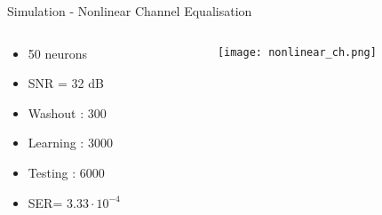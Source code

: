 \begin{frame}{Simulation - Nonlinear Channel Equalisation}

	\begin{columns} %
	\begin{column}{.33\textwidth}
	
		\begin{itemize}
			\item 50 neurons
			\item SNR = 32 dB
			\item Washout : 300
			\item Learning : 3000
			\item Testing : 6000
			\item SER= $3.33 \cdot 10^{-4}$
		\end{itemize}
		
	\end{column}%
	\hfill%
	\begin{column}{.63\textwidth}
	\begin{figure}
		\texttt{[image: nonlinear\_ch.png]}
	\end{figure}

	\end{column}%
	\end{columns}
	
\end{frame}
